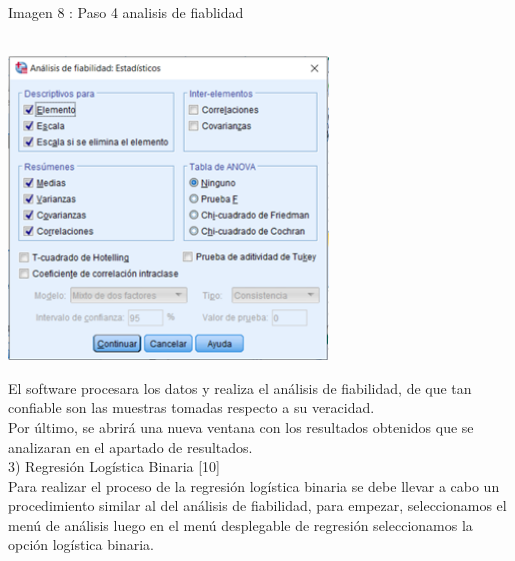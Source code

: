 \documentclass[conference]{IEEEtran}
\begin{document}
\begin{center}
\caption{Imagen 8 : Paso  4 analisis de fiablidad}\\
\includegraphics[width=8.5cm]{imagenes/IMAGEN7.png}
\end{center}
El software procesara los datos y realiza el análisis de fiabilidad, de que tan confiable son las muestras tomadas respecto a su veracidad.\\   

Por último, se abrirá una nueva ventana con los resultados obtenidos que se analizaran en el apartado de resultados.\\   

3)	Regresión Logística Binaria [10]\\

 Para realizar el proceso de la regresión logística binaria se debe llevar a cabo un procedimiento similar al del análisis de fiabilidad, para empezar, seleccionamos el menú de análisis luego en el menú desplegable de regresión seleccionamos la opción logística binaria.\\
\end{document}
